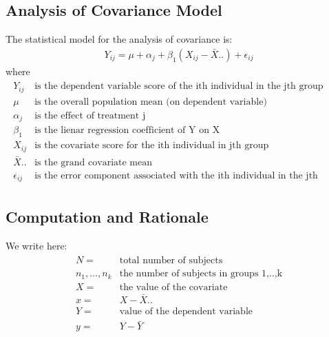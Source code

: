 \documentclass{article}
\begin{document}
\subsection{Analysis of Covariance Model}
The statistical model for the analysis of covariance is: 
\begin{align}
  Y_{ij} = \mu + \alpha_j + \beta_1(X_{ij} - \bar{X}..) + \epsilon_{ij}
\end{align}
where
\begin{eqnarray*}
  \begin{array}{ll}
    Y_{ij} & \text{is the dependent variable score of the ith individual in the jth group} \\
    \mu &\text{is the overall population mean (on dependent variable)} \\
    \alpha_j &\text{is the effect of treatment j} \\
    \beta_1 &\text{is the lienar regression coefficient of Y on X} \\
    X_{ij}&\text{is the covariate score for the ith individual in jth group} \\
    \bar{X}.. &\text{is the grand covariate mean} \\
    \epsilon_{ij}&\text{is the error component associated with the ith individual in the jth group }
  \end{array}
\end{eqnarray*}

\subsection{Computation and Rationale}
We write here: 
\begin{eqnarray*}
  \begin{array}{ll}
    N = & \text{total number of subjects} \\
    n_1, ..., n_k & \text{the number of subjects in groups 1,..,k} \\
    X = & \text{the value of the covariate} \\
    x = & X-\bar{X}.. \\
    Y = & \text{value of the dependent variable}\\
    y = & Y-\bar{Y}
  \end{array}
\end{eqnarray*} 
\end{document}
